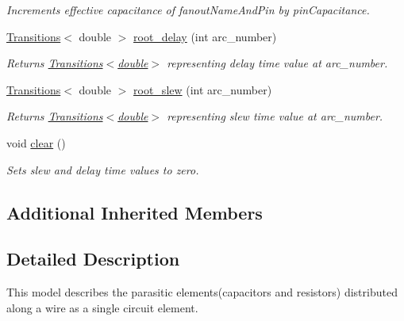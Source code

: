 \begin{DoxyCompactItemize}
\begin{DoxyCompactList}\small\item\em Increments effective capacitance of fanout\-Name\-And\-Pin by pin\-Capacitance. \end{DoxyCompactList}\item 
\hyperlink{classTransitions}{Transitions}$<$ double $>$ \hyperlink{classRCTreeWireDelayModel_a5575e4f4e598047dd87fee0707d135d3}{root\-\_\-delay} (int arc\-\_\-number)
\begin{DoxyCompactList}\small\item\em Returns \hyperlink{classTransitions}{Transitions$<$double$>$} representing delay time value at arc\-\_\-number. \end{DoxyCompactList}\item 
\hyperlink{classTransitions}{Transitions}$<$ double $>$ \hyperlink{classRCTreeWireDelayModel_aa314aa73bf2e25008d330ad19544e210}{root\-\_\-slew} (int arc\-\_\-number)
\begin{DoxyCompactList}\small\item\em Returns \hyperlink{classTransitions}{Transitions$<$double$>$} representing slew time value at arc\-\_\-number. \end{DoxyCompactList}\item 
void \hyperlink{classRCTreeWireDelayModel_acb14554ad26108d350770391b1923c51}{clear} ()
\begin{DoxyCompactList}\small\item\em Sets slew and delay time values to zero. \end{DoxyCompactList}\end{DoxyCompactItemize}
\subsection*{Additional Inherited Members}


\subsection{Detailed Description}
This model describes the parasitic elements(capacitors and resistors) distributed along a wire as a single circuit element. 

